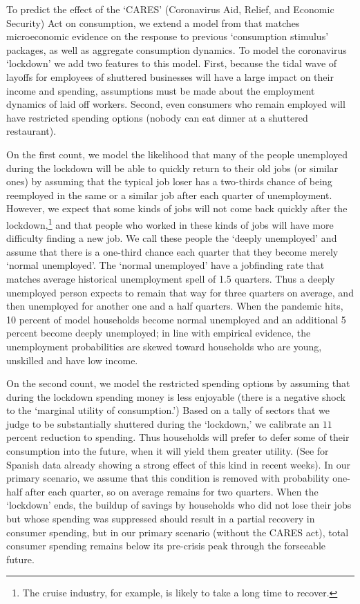 \documentclass[titlepage]{\econtex}
\begin{document}
To predict the effect of the `CARES' (Coronavirus Aid, Relief, and Economic Security) Act on consumption, we extend a model from \cite{carroll_sticky_2020} that matches microeconomic evidence on the response to previous `consumption stimulus' packages, as well as aggregate consumption dynamics.
To model the coronavirus `lockdown' we add two features to this model. First, because the tidal wave of layoffs for employees of shuttered businesses will have a large impact on their income and spending, assumptions must be made about the employment dynamics of laid off workers.
Second, even consumers who remain employed will have restricted spending options (nobody can eat dinner at a shuttered restaurant).

On the first count, we model the likelihood that many of the people unemployed during the lockdown will be able to quickly return to their old jobs (or similar ones) by assuming that the typical job loser has a two-thirds chance of being reemployed in the same or a similar job after each quarter of unemployment.  However, we expect that some kinds of jobs will not come back quickly after the lockdown,\footnote{The cruise industry, for example, is likely to take a long time to recover.} and that people who worked in these kinds of jobs will have more difficulty finding a new job.  We call these people the `deeply unemployed' and assume that there is a one-third chance each quarter that they become merely `normal unemployed'.  The `normal unemployed' have a jobfinding rate that matches average historical unemployment spell of 1.5 quarters.  Thus a deeply unemployed person expects to remain that way for three quarters on average, and then unemployed for another one and a half quarters.  When the pandemic hits, 10 percent of model households become normal unemployed and an additional 5 percent become deeply unemployed; in line with empirical evidence, the unemployment probabilities are skewed toward households who are young, unskilled and have low income.

On the second count, we model the restricted spending options by assuming that during the lockdown spending money is less enjoyable (there is a negative shock to the `marginal utility of consumption.')
Based on a tally of sectors that we judge to be substantially shuttered during the `lockdown,' we calibrate an $11$ percent reduction to spending.
Thus households will prefer to defer some of their consumption into the future, when it will yield them greater utility. (See \cite{SpanishSpending} for Spanish data already showing a strong effect of this kind in recent weeks).
In our primary scenario, we assume that this condition is removed with probability one-half after each quarter, so on average remains for two quarters.  When the `lockdown' ends, the buildup of savings by households who did not lose their jobs but whose spending was suppressed should result in a partial recovery in consumer spending, but in our primary scenario (without the CARES act), total consumer spending remains below its pre-crisis peak through the forseeable future.  
\end{document}
